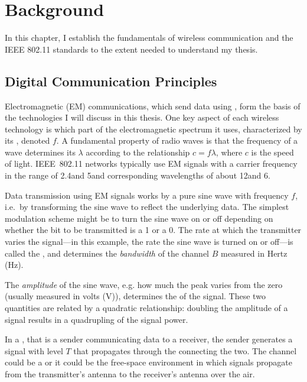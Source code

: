 \ifx\mainfile\undefined

\setcounter{chapter}{1} %
\fi

\cleardoublepage
\chapter{Background}
\label{chap:background}

In this chapter, I establish the fundamentals of wireless communication and the IEEE 802.11 standards to the extent needed to understand my thesis.

\section{Digital Communication Principles}
Electromagnetic (EM) communications, which send data using , form the basis of the technologies I will discuss in this thesis. One key aspect of each wireless technology is which part of the electromagnetic spectrum it uses, characterized by its , denoted $f$. A fundamental property of radio waves is that the frequency of a wave determines its  $\lambda$ according to the relationship $c=f\lambda$, where $c$ is the speed of light. IEEE~802.11 networks typically use EM signals with a carrier frequency in the range of 2.4\GHz and 5\GHz and corresponding wavelengths of about 12\cm and 6\cm.

Data transmission using EM signals works by  a pure sine wave with frequency $f$, i.e.\ by transforming the sine wave to reflect the underlying data. The simplest modulation scheme might be to turn the sine wave on or off depending on whether the bit to be transmitted is a 1 or a 0. The rate at which the transmitter varies the signal---in this example, the rate the sine wave is turned on or off---is called the , and determines the \emph{bandwidth} of the channel $B$ measured in Hertz (Hz).

The \emph{amplitude} of the sine wave, e.g. how much the peak varies from the zero (usually measured in volts (V)), determines the  of the signal. These two quantities are related by a quadratic relationship: doubling the amplitude of a signal results in a quadrupling of the signal power.

In a , that is a sender communicating data to a receiver, the sender generates a signal with  level $T$ that propagates through the  connecting the two. The channel could be a  or it could be the free-space  environment in which signals propagate from the transmitter's antenna to the receiver's antenna over the air.

